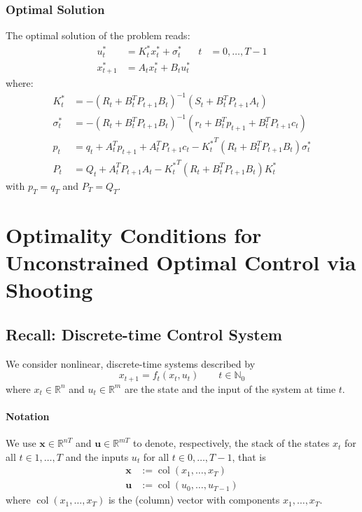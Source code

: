 \documentclass[openany]{book}
\DeclareMathOperator{\col}{col}           %
\theoremstyle{definition}
\theoremstyle{remark}
\begin{document}
\subsection{Optimal Solution}
The optimal solution of the problem reads:
\begin{align*}
    u_t^* &= K_t^*x_t^* + \sigma_t^* & t &= 0,\dots,T-1\\
    x_{t+1}^* &= A_tx_t^* + B_tu_t^*
\end{align*}
where:
\begin{align*}
    K_t^* &= -(R_t + B_t^TP_{t+1}B_t)^{-1}(S_t + B_t^TP_{t+1}A_t)\\
    \sigma_t^* &= -(R_t + B_t^TP_{t+1}B_t)^{-1}(r_t + B_t^Tp_{t+1} + B_t^TP_{t+1}c_t)\\
    p_t &= q_t + A_t^Tp_{t+1} + A_t^TP_{t+1}c_t - {K_t^*}^T(R_t + B_t^TP_{t+1}B_t)\sigma_t^*\\
    P_t &= Q_t + A_t^TP_{t+1}A_t - {K_t^*}^T(R_t + B_t^TP_{t+1}B_t)K_t^*
\end{align*}
with $p_T = q_T$ and $P_T = Q_T$.



\chapter{Optimality Conditions for Unconstrained Optimal Control via Shooting}
\section{Recall: Discrete-time Control System }
We consider nonlinear, discrete-time systems described by
\[
    x_{t+1} = f_t(x_t, u_t) \qquad t \in \mathbb{N}_0
\]
where $x_t \in \mathbb{R}^n$ and $u_t \in \mathbb{R}^m$ are the state and the input of the system at time $t$.

\subsubsection{Notation}
We use $\mathbf{x} \in \mathbb{R}^{nT}$ and $\mathbf{u} \in \mathbb{R}^{mT}$ to denote, respectively, the stack of the states $x_t$ for all $t \in 1,\ldots,T$ and the inputs $u_t$ for all $t \in 0,\ldots,T-1$, that is
\begin{align*}
    \mathbf{x} &:= \col(x_1,\ldots,x_T) \\
    \mathbf{u} &:= \col(u_0,\ldots,u_{T-1})
\end{align*}
where $\col(x_1,\ldots,x_T)$ is the (column) vector with components $x_1,\ldots,x_T$.
\end{document}
